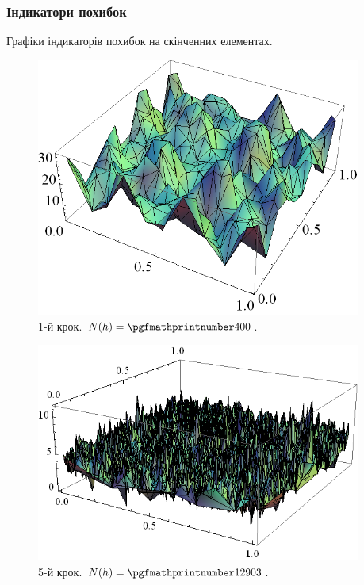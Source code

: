 \begin{frame}[allowframebreaks]
	\frametitle<presentation>{Індикатори похибок}
		Графіки індикаторів похибок на скінченних елементах.
		\begin{figure}[H]
			\begin{columns}
			 	\begin{column}{0.5\textwidth}
			 		\includegraphics[width=\textwidth]{problem1/my/AEE/1}
			 	 \end{column}
			     \begin{column}{0.3\textwidth}
			     	\caption*{1-й крок. $N(h) = \nn{400}$.}
			     \end{column}
		     \end{columns}
		\end{figure}

		\begin{figure}[H]
			\begin{columns}
			 	\begin{column}{0.7\textwidth}
			 		\includegraphics[width=\textwidth]{problem1/my/AEE/5}
			 	 \end{column}
			     \begin{column}{0.3\textwidth}
			     	\caption*{5-й крок. $N(h) = \nn{12903}$.}
			     \end{column}
		     \end{columns}
		\end{figure}


\end{frame}
